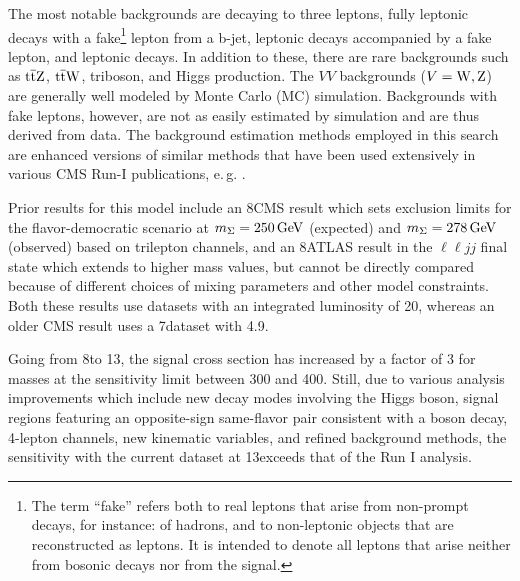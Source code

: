 The most notable backgrounds are \WZ decaying to three leptons, fully leptonic \ttbar decays with a fake\footnote{The term ``fake'' refers both to real leptons that arise from non-prompt decays, for instance: of hadrons, and to non-leptonic objects that are reconstructed as leptons. It is intended to denote all leptons that arise neither from bosonic decays nor from the signal.} lepton from a b-jet, leptonic \Z decays accompanied by a fake lepton, and leptonic \ZZ decays. In addition to these, there are rare backgrounds such as $\mathrm{t}\overline{\mathrm{t}}\mathrm{Z}$, $\mathrm{t}\overline{\mathrm{t}}\mathrm{W}$, triboson, and Higgs production.
The $VV$ backgrounds ($V = \mathrm{W}, \mathrm{Z}$) are generally well modeled by Monte Carlo (MC) simulation. Backgrounds with fake leptons, however, are not as easily estimated by simulation and are thus derived from data. The background estimation methods employed in this search are enhanced versions of similar methods that have been used extensively in various CMS Run-I publications, e.\,g. \cite{Chatrchyan:2013xsw,Chatrchyan:2014aea,Khachatryan:2014mma,Khachatryan:2014jya}.

Prior results for this model include an 8\TeV CMS result \cite{CMS-PAS-EXO-14-001} which sets exclusion limits for the flavor-democratic scenario at $m_\Sigma = 250\,\text{Ge\hspace{-.08em}V}$ (expected) and $m_\Sigma = 278\,\text{Ge\hspace{-.08em}V}$ (observed) based on trilepton channels, and an 8\TeV ATLAS result in the $\ell\ell jj$ final state \cite{ATLAS-CERN-PH-EP-2015-094} which extends to higher mass values, but cannot be directly compared because of different choices of mixing parameters and other model constraints. Both these results use datasets with an integrated luminosity of 20\fbinv, whereas an older CMS result uses a 7\TeV dataset with 4.9\fbinv \cite{CMS-PAPER-EXO-11-073}.

Going from 8\TeV to 13\TeV, the signal cross section has increased by a factor of 3 for masses at the sensitivity limit between 300 and 400\GeV. Still, due to various analysis improvements which include new decay modes involving the Higgs boson, signal regions featuring an opposite-sign same-flavor pair consistent with a \Z boson decay, 4-lepton channels, new kinematic variables, and refined background methods, the sensitivity with the current \fullLumi dataset at 13\TeV exceeds that of the Run I analysis.


